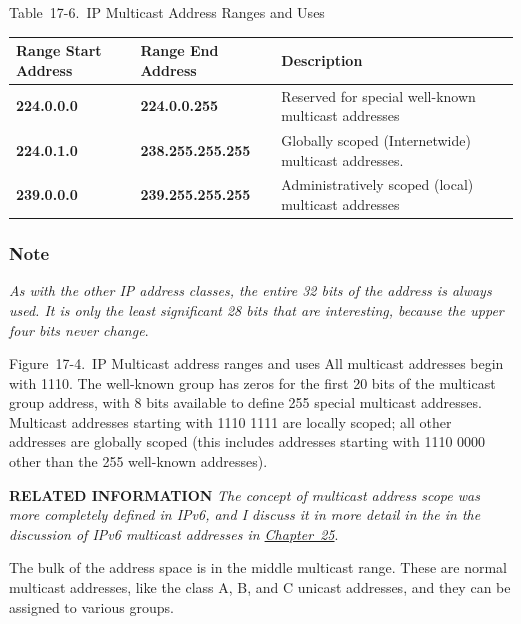 \protect\hypertarget{ch17s06.htmlux5cux23ip_multicast_address_ranges_and_uses}{}{}

Table~17-6.~IP Multicast Address Ranges and Uses

\begin{longtable}[]{@{}lll@{}}
\toprule
Range Start Address & Range End Address & Description\tabularnewline
\midrule
\endhead
{\textbf{224.0.0.0}} & {\textbf{224.0.0.255}} & Reserved for special
well-known multicast addresses\tabularnewline
{\textbf{224.0.1.0}} & {\textbf{238.255.255.255}} & Globally scoped
(Internetwide) multicast addresses.\tabularnewline
{\textbf{239.0.0.0}} & {\textbf{239.255.255.255}} & Administratively
scoped (local) multicast addresses\tabularnewline
\bottomrule
\end{longtable}

\subsubsection[Note]{\texorpdfstring{\protect\hypertarget{ch17s06.htmlux5cux23note-68}{}{}Note}{Note}}

{\emph{As with the other IP address classes, the entire 32 bits of the
address is always used. It is only the least significant 28 bits that
are interesting, because the upper four bits never change}}.

\protect\hypertarget{ch17s06.htmlux5cux23ip_multicast_address_ranges_and_uses_all}{}{}

\protect\hypertarget{ch17s06.htmlux5cux23I_mediaobject3_d1e17790}{}{}

Figure~17-4.~IP Multicast address ranges and uses All multicast
addresses begin with 1110. The well-known group has zeros for the first
20 bits of the multicast group address, with 8 bits available to define
255 special multicast addresses. Multicast addresses starting with 1110
1111 are locally scoped; all other addresses are globally scoped (this
includes addresses starting with 1110 0000 other than the 255 well-known
addresses).


{\textbf{RELATED INFORMATION}} {\emph{The concept of multicast address
scope was more completely defined in IPv6, and I discuss it in more
detail in the in the discussion of IPv6 multicast addresses in
\protect\hyperlink{ch25.html}{Chapter~25}}}.

The bulk of the address space is in the middle multicast range. These
are normal multicast addresses, like the class A, B, and C unicast
addresses, and they can be assigned to various groups.

